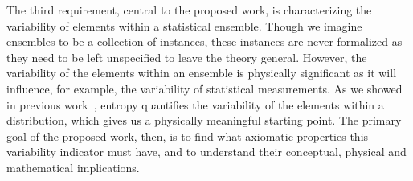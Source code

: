 The third requirement, central to the proposed work, is characterizing the variability of elements within a statistical ensemble. Though we imagine ensembles to be a collection of instances, these instances are never formalized as they need to be left unspecified to leave the theory general. However, the variability of the elements within an ensemble is physically significant as it will influence, for example, the variability of statistical measurements. As we showed in previous work~\cite{Carcassi:2021}, entropy quantifies the variability of the elements within a distribution, which gives us a physically meaningful starting point. The primary goal of the proposed work, then, is to find what axiomatic properties this variability indicator must have, and to understand their conceptual, physical and mathematical implications.

